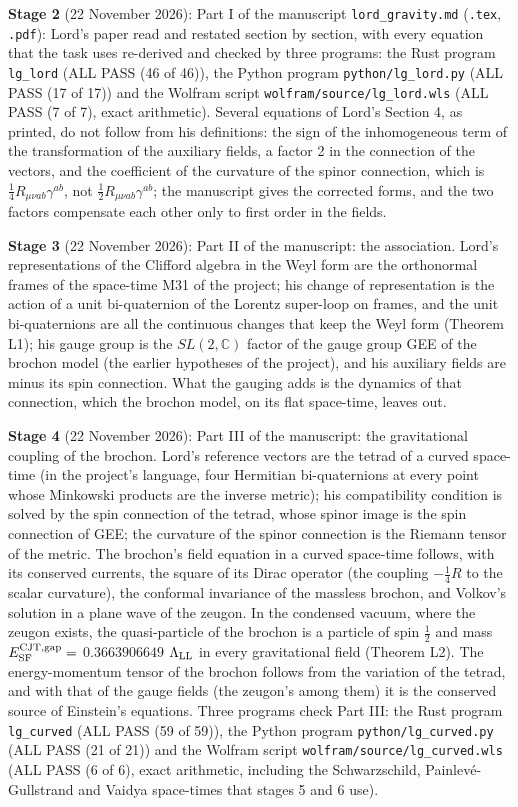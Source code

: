 \documentclass[
  10pt,
]{article}
\begin{document}
\textbf{Stage 2} (22 November 2026): Part I of the manuscript
\texttt{lord\_gravity.md} (\texttt{.tex}, \texttt{.pdf}): Lord's paper
read and restated section by section, with every equation that the task
uses re-derived and checked by three programs: the Rust program
\texttt{lg\_lord} (ALL PASS (46 of 46)), the Python program
\texttt{python/lg\_lord.py} (ALL PASS (17 of 17)) and the Wolfram script
\texttt{wolfram/source/lg\_lord.wls} (ALL PASS (7 of 7), exact
arithmetic). Several equations of Lord's Section 4, as printed, do not
follow from his definitions: the sign of the inhomogeneous term of the
transformation of the auxiliary fields, a factor 2 in the connection of
the vectors, and the coefficient of the curvature of the spinor
connection, which is \(\tfrac14R_{\mu\nu ab}\gamma^{ab}\), not
\(\tfrac12R_{\mu\nu ab}\gamma^{ab}\); the manuscript gives the corrected
forms, and the two factors compensate each other only to first order in
the fields.

\textbf{Stage 3} (22 November 2026): Part II of the manuscript: the
association. Lord's representations of the Clifford algebra in the Weyl
form are the orthonormal frames of the space-time M31 of the project;
his change of representation is the action of a unit bi-quaternion of
the Lorentz super-loop on frames, and the unit bi-quaternions are all
the continuous changes that keep the Weyl form (Theorem L1); his gauge
group is the \(SL(2,\mathbb C)\) factor of the gauge group GEE of the
brochon model (the earlier hypotheses of the project), and his auxiliary
fields are minus its spin connection. What the gauging adds is the
dynamics of that connection, which the brochon model, on its flat
space-time, leaves out.

\textbf{Stage 4} (22 November 2026): Part III of the manuscript: the
gravitational coupling of the brochon. Lord's reference vectors are the
tetrad of a curved space-time (in the project's language, four Hermitian
bi-quaternions at every point whose Minkowski products are the inverse
metric); his compatibility condition is solved by the spin connection of
the tetrad, whose spinor image is the spin connection of GEE; the
curvature of the spinor connection is the Riemann tensor of the metric.
The brochon's field equation in a curved space-time follows, with its
conserved currents, the square of its Dirac operator (the coupling
\(-\tfrac14R\) to the scalar curvature), the conformal invariance of the
massless brochon, and Volkov's solution in a plane wave of the zeugon.
In the condensed vacuum, where the zeugon exists, the quasi-particle of
the brochon is a particle of spin \(\tfrac12\) and mass
\(E^{\rm CJT,gap}_{\rm SF}=\) \(0.3663906649\) \(\Lambda_{\rm LL}\) in
every gravitational field (Theorem L2). The energy-momentum tensor of
the brochon follows from the variation of the tetrad, and with that of
the gauge fields (the zeugon's among them) it is the conserved source of
Einstein's equations. Three programs check Part III: the Rust program
\texttt{lg\_curved} (ALL PASS (59 of 59)), the Python program
\texttt{python/lg\_curved.py} (ALL PASS (21 of 21)) and the Wolfram
script \texttt{wolfram/source/lg\_curved.wls} (ALL PASS (6 of 6), exact
arithmetic, including the Schwarzschild, Painlevé-Gullstrand and Vaidya
space-times that stages 5 and 6 use).
\end{document}
